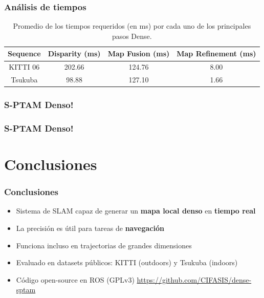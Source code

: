 \documentclass[compress]{beamer}
\begin{document}
\begin{frame}
	\frametitle{Análisis de tiempos}
	\begin{table}[!htb]
		\centering
		\small
		\begin{tabular}{cccc}
			\toprule
			Sequence & Disparity (ms) & Map Fusion (ms) & Map Refinement (ms) \\
			\midrule
			KITTI 06 & 202.66 & 124.76 & 8.00 \\
			Tsukuba & 98.88 & 127.10 & 1.66 \\
			\bottomrule
		\end{tabular}
		\caption{Promedio de los tiempos requeridos (en ms) por cada uno de los principales pasos Dense.}
		\label{table:table_times}
	\end{table}
\end{frame}

\begin{frame}
	\frametitle{S-PTAM Denso!}
	\centering
	
\end{frame}

\begin{frame}
	\frametitle{S-PTAM Denso!}
	\centering
	
\end{frame}


\section{Conclusiones}

\begin{frame}
	\frametitle{Conclusiones}
	\begin{itemize}
		\item Sistema de SLAM capaz de generar un \textbf{mapa local denso} en \textbf{tiempo real}
        \item La precisión es útil para tareas de \textbf{navegación}
        \item Funciona incluso en trajectorias de grandes dimensiones
        \item Evaluado en datasets públicos: KITTI (outdoors) y Tsukuba (indoors)
	    \item Código open-source en ROS (GPLv3)
	    \url{https://github.com/CIFASIS/dense-sptam}
	\end{itemize}
\end{frame}
\end{document}
